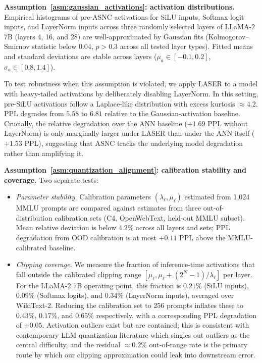 \documentclass{article}
\theoremstyle{plain}
\theoremstyle{definition}
\theoremstyle{remark}
\begin{document}
\noindent\textbf{Assumption~\ref{asm:gaussian_activations}: activation
distributions.}
Empirical histograms of pre-ASNC activations for SiLU inputs, Softmax logit
inputs, and LayerNorm inputs across three randomly selected layers of LLaMA-2
7B (layers 4, 16, and 28) are well-approximated by Gaussian fits
(Kolmogorov--Smirnov statistic below $0.04$, $p > 0.3$ across all tested
layer types). Fitted means and standard deviations are stable across layers
($\mu_a \in [-0.1, 0.2]$, $\sigma_a \in [0.8, 1.4]$).

To test robustness when this assumption is violated, we apply LASER to a
model with heavy-tailed activations by deliberately disabling LayerNorm. In
this setting, pre-SiLU activations follow a Laplace-like distribution with
excess kurtosis $\approx 4.2$. PPL degrades from $5.58$ to $6.81$ relative to
the Gaussian-activation baseline. Crucially, the relative degradation over
the ANN baseline ($+1.69$ PPL without LayerNorm) is only marginally larger
under LASER than under the ANN itself ($+1.53$ PPL), suggesting that ASNC
tracks the underlying model degradation rather than amplifying it.

\noindent\textbf{Assumption~\ref{asm:quantization_alignment}: calibration
stability and coverage.}
Two separate tests:
\begin{itemize}
\item \emph{Parameter stability.} Calibration parameters
$(\lambda_\ell, \mu_\ell)$ estimated from 1{,}024 MMLU prompts are compared
against estimates from three out-of-distribution calibration sets (C4,
OpenWebText, held-out MMLU subset). Mean relative deviation is below 4.2\%
across all layers and sets; PPL degradation from OOD calibration is at most
$+0.11$ PPL above the MMLU-calibrated baseline.
\item \emph{Clipping coverage.} We measure the fraction of inference-time
activations that fall outside the calibrated clipping range
$[\mu_\ell, \mu_\ell + (2^N-1)/\lambda_\ell]$ per layer. For the LLaMA-2 7B
operating point, this fraction is $0.21\%$ (SiLU inputs), $0.09\%$ (Softmax
logits), and $0.34\%$ (LayerNorm inputs), averaged over WikiText-2. Reducing
the calibration set to 256 prompts inflates these to $0.43\%$, $0.17\%$, and
$0.65\%$ respectively, with a corresponding PPL degradation of $+0.05$.
Activation outliers exist but are contained; this is consistent with
contemporary LLM quantization literature which singles out outliers as the
central difficulty, and the residual $\approx\!0.2\%$ out-of-range rate is
the primary route by which our clipping approximation could leak into
downstream error.
\end{itemize}
\end{document}
